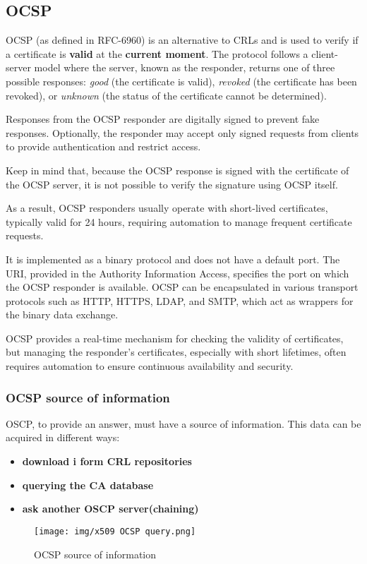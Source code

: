 \subsection{OCSP}
OCSP (as defined in RFC-6960) is an alternative to CRLs and is used to
verify if a certificate is \textbf{valid} at the \textbf{current
moment}. The protocol follows a client-server model where the server,
known as the responder, returns one of three possible responses:
\textit{good} (the certificate is valid), \textit{revoked} (the
certificate has been revoked), or \textit{unknown} (the status of the
certificate cannot be determined).

Responses from the OCSP responder are digitally signed to prevent fake
responses. Optionally, the responder may accept only signed requests
from clients to provide authentication and restrict access.  
\begin{boxH}
  Keep in mind that, because the OCSP response is signed with the
  certificate of the OCSP server, it is not possible to verify the 
  signature using OCSP itself. 
\end{boxH}

As a result, OCSP responders usually operate with short-lived
certificates, typically valid for 24 hours, requiring automation to
manage frequent certificate requests.


It is implemented as a binary protocol and does not have a 
default port. The URI, provided in the Authority Information 
Access, specifies the port on which the OCSP responder is 
available. OCSP can be encapsulated in various transport protocols 
such as HTTP, HTTPS, LDAP, and SMTP, which act as wrappers for the 
binary data exchange.

OCSP provides a real-time mechanism for checking the validity of 
certificates, but managing the responder’s certificates, especially 
with short lifetimes, often requires automation to ensure 
continuous availability and security.

\subsubsection{OCSP source of information}
OSCP, to provide an answer, must have a source of information. This
data can be acquired in different ways:
\begin{itemize}
  \item \textbf{download i form CRL repositories}
  \item \textbf{querying the CA database}
  \item \textbf{ask another OSCP server(chaining)}
\end{itemize}
\begin{figure}[H]
  \centering
  \texttt{[image: img/x509 OCSP query.png]}
  \label{fig:OCSP source of information}

  \caption{OCSP source of information}
\end{figure}

